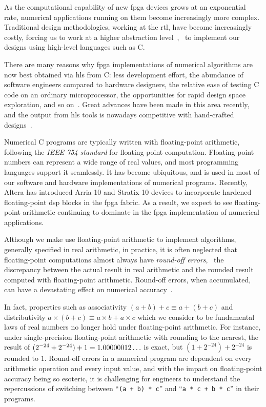 As the computational capability of new \gls{fpga} devices grows at an
exponential rate, numerical applications running on them become increasingly
more complex.  Traditional design methodologies, working at the \gls{rtl},
have become increasingly costly, forcing us to work at a higher abstraction
level~\cite{gajski}, \ie~to implement our designs using high-level languages
such as C\@.

There are many reasons why \gls{fpga} implementations of numerical algorithms
are now best obtained via \gls{hls} from C\@: less development effort, the
abundance of software engineers compared to hardware designers, the relative
ease of testing C code on an ordinary microprocessor, the opportunities for
rapid design space exploration, and so on~\cite{meeus12}. Great advances
have been made in this area recently, and the output from \gls{hls} tools is
nowadays competitive with hand-crafted designs~\cite{bdti_xilinx}.

Numerical C programs are typically written with floating-point arithmetic,
following the \emph{IEEE 754 standard} for floating-point computation.
Floating-point numbers can represent a wide range of real values, and most
programming languages support it seamlessly.  It has become ubiquitous, and
is used in most of our software and hardware implementations of numerical
programs.  Recently, Altera has introduced Arria 10 and Stratix 10 devices to
incorporate hardened floating-point \gls{dsp} blocks in the \gls{fpga} fabric.
As a result, we expect to see floating-point arithmetic continuing to dominate
in the \gls{fpga} implementation of numerical applications.

Although we make use floating-point arithmetic to implement algorithms,
generally specified in real arithmetic, in practice, it is often neglected that
floating-point computations almost always have \emph{round-off errors}, \ie~the
discrepancy between the actual result in real arithmetic and the rounded result
computed with floating-point arithmetic.  Round-off errors, when accumulated,
can have a devastating effect on numerical accuracy~\cite{higham02}.

In fact, properties such as associativity $(a + b) + c \equiv a + (b + c)$
and distributivity $a \times (b + c) \equiv a \times b + a \times c$ which
we consider to be fundamental laws of real numbers no longer hold under
floating-point arithmetic.  For instance, under single-precision floating-point
arithmetic with rounding to the nearest, the result of $(2^{-24} + 2^{-24})
+ 1 = 1.00000012\mathellipsis$ is exact, but $(1 + 2^{-24}) + 2^{-24}$ is
rounded to $1$.  Round-off errors in a numerical program are dependent on
every arithmetic operation and every input value, and with the impact on
floating-point accuracy being so esoteric, it is challenging for engineers to
understand the repercussions of switching between ``\verb|(a + b) * c|'' and
``\verb|a * c + b * c|'' in their programs.

